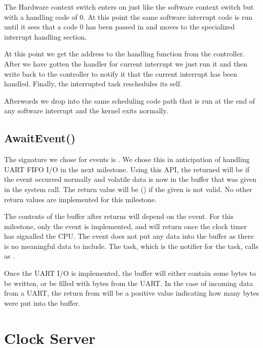 \documentclass[pdftex,10pt,a4paper]{article}
\begin{document}
The Hardware context switch enters on  just like the
software context switch but with a handling code of 0. At this point the same
software interrupt code is run until it sees that a code 0 has been passed in
and moves to the specialized interrupt handling section.

At this point we get the address to the handling function from the  
controller. After we have gotten the handler for current interrupt we just 
run it and then write back to the  controller to notify it that the 
current interrupt has been handled. Finally, the interrupted task reschedules 
its self.

Afterwords we drop into the same scheduling code path that is run at the end of
any software interrupt and the kernel exits normally.

\subsection*{AwaitEvent()}

The signature we chose for events is
. We chose
this in anticipation of handling UART FIFO I/O in the next
milestone. Using this API, the returned  will be  if
the event occurred normally and volatile data is now in the
 buffer that was given in the system call. The return value
will be  () if the given  is
not valid. No other return values are implemented for this milestone.

The contents of the  buffer after  returns
will depend on the event. For this milestone, only the
 event is implemented, and will return once the clock
timer has signalled the CPU. The  event does not put
any data into the  buffer as there is no meaningful data to
include. The  task, which is the notifier for the
 task, calls  as
.

Once the UART I/O is implemented, the  buffer will either
contain some bytes to be written, or be filled with bytes from the
UART. In the case of incoming data from a UART, the return from
 will be a positive value indicating how many bytes
were put into the  buffer.

\section*{Clock Server}
\end{document}
